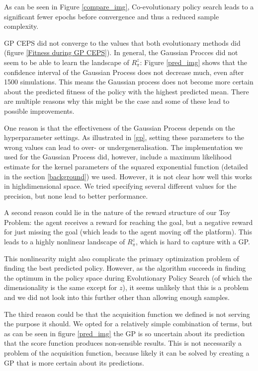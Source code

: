 
As can be seen in Figure \ref{compare_img}, Co-evolutionary policy search leads to a significant fewer epochs before convergence and thus a reduced sample complexity. 

GP CEPS did not converge to the values that both evolutionary methods did (figure \ref{Fitness during GP CEPS}). In general, the Gaussian Procces did not seem to be able to learn the landscape of $R_{\pi}^z$: Figure \ref{pred_img} shows that the confidence interval of the Gaussian Process does not decrease much, even after 1500 simulations. This means the Gaussian process does not become more certain about the predicted fitness of the policy with the highest predicted mean.
There are multiple reasons why this might be the case and some of these lead to possible improvements. 

One reason is that the effectiveness of the Gaussian Process depends on the hyperparameter settings. As illustrated in \ref{gp}, setting these parameters to the wrong values can lead to over- or undergeneralisation. The implementation we used for the Gaussian Process did, however, include a maximum likelihood estimate for the kernel parameters of the squared exponential function (detailed in the section \ref{background}) we used. However, it is not clear how well this works in highdimensional space. We tried specifying several different values for the precision, but none lead to better performance. 

A second reason could lie in the nature of the reward structure of our Toy Problem: the agent receives a reward for reaching the goal, but a negative reward for just missing the goal (which leads to the agent moving off the platform). This leads to a highly nonlinear landscape of $R_{\pi}^z$, which is hard to capture with a GP. 

This nonlinearity might also complicate the primary optimization problem of finding the best predicted policy. However, as the algorithm succeeds in finding the optimum in the policy space during Evolutionary Policy Search (of which the dimensionality is the same except for $z$), it seems unlikely that this is a problem and we did not look into this further other than allowing enough samples. 

The third reason could be that the acquisition function we defined is not serving the purpose it should. We opted for a relatively simple combination of terms, but as can be seen in figure \ref{pred_img} the GP is so uncertain about its prediction that the score function produces non-sensible results. This is not necessarily a problem of the acquisition function, because likely it can be solved by creating a GP that is more certain about its predictions.

